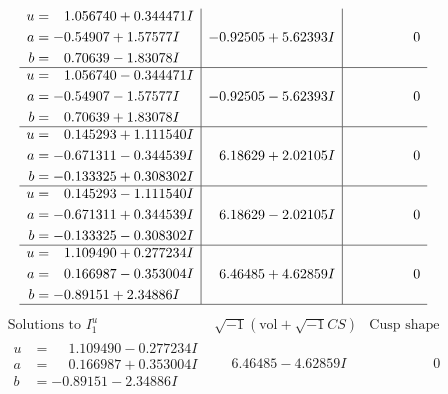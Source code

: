 \documentclass[1p]{elsarticle_modified}
\theoremstyle{definition}
\newcommand{\I}{\sqrt{-1}}
\begin{document}
$$\begin{array}{c|c|c}
\begin{aligned}
u &= \phantom{-}1.056740 + 0.344471 I \\
a &= -0.54907 + 1.57577 I \\
b &= \phantom{-}0.70639 - 1.83078 I\end{aligned}
 & -0.92505 + 5.62393 I & \phantom{-0.000000 } 0 \\ \hline\begin{aligned}
u &= \phantom{-}1.056740 - 0.344471 I \\
a &= -0.54907 - 1.57577 I \\
b &= \phantom{-}0.70639 + 1.83078 I\end{aligned}
 & -0.92505 - 5.62393 I & \phantom{-0.000000 } 0 \\ \hline\begin{aligned}
u &= \phantom{-}0.145293 + 1.111540 I \\
a &= -0.671311 - 0.344539 I \\
b &= -0.133325 + 0.308302 I\end{aligned}
 & \phantom{-}6.18629 + 2.02105 I & \phantom{-0.000000 } 0 \\ \hline\begin{aligned}
u &= \phantom{-}0.145293 - 1.111540 I \\
a &= -0.671311 + 0.344539 I \\
b &= -0.133325 - 0.308302 I\end{aligned}
 & \phantom{-}6.18629 - 2.02105 I & \phantom{-0.000000 } 0 \\ \hline\begin{aligned}
u &= \phantom{-}1.109490 + 0.277234 I \\
a &= \phantom{-}0.166987 - 0.353004 I \\
b &= -0.89151 + 2.34886 I\end{aligned}
 & \phantom{-}6.46485 + 4.62859 I & \phantom{-0.000000 } 0\\
 \hline 
 \end{array}$$\newpage$$\begin{array}{c|c|c}  
\text{Solutions to }I^u_{1}& \I (\text{vol} + \sqrt{-1}CS) & \text{Cusp shape}\\
 \hline 
\begin{aligned}
u &= \phantom{-}1.109490 - 0.277234 I \\
a &= \phantom{-}0.166987 + 0.353004 I \\
b &= -0.89151 - 2.34886 I\end{aligned}
 & \phantom{-}6.46485 - 4.62859 I & \phantom{-0.000000 } 0 \\ \hline\begin{aligned}

\end{aligned}
\end{array}$$
\end{document}
